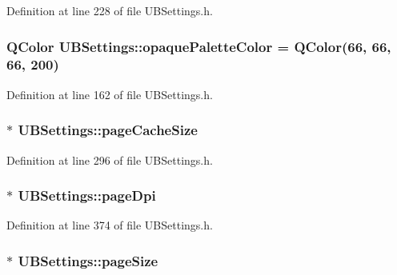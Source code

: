 Definition at line 228 of file U\-B\-Settings.\-h.

\hypertarget{class_u_b_settings_a3b15f9b10941aad5dcc81472fde33ea3}{
\subsubsection[{opaque\-Palette\-Color}]{\setlength{\rightskip}{0pt plus 5cm}Q\-Color U\-B\-Settings\-::opaque\-Palette\-Color = Q\-Color(66, 66, 66, 200)\hspace{0.3cm}{\ttfamily [static]}}}\label{db/d66/class_u_b_settings_a3b15f9b10941aad5dcc81472fde33ea3}


Definition at line 162 of file U\-B\-Settings.\-h.

\hypertarget{class_u_b_settings_aac2ebdada657a3505f3e3b924a02e4f8}{
\subsubsection[{page\-Cache\-Size}]{$\ast$ U\-B\-Settings\-::page\-Cache\-Size}}\label{db/d66/class_u_b_settings_aac2ebdada657a3505f3e3b924a02e4f8}


Definition at line 296 of file U\-B\-Settings.\-h.

\hypertarget{class_u_b_settings_a9da52a4a55207f616c01ec65be66e635}{
\subsubsection[{page\-Dpi}]{$\ast$ U\-B\-Settings\-::page\-Dpi}}\label{db/d66/class_u_b_settings_a9da52a4a55207f616c01ec65be66e635}


Definition at line 374 of file U\-B\-Settings.\-h.

\hypertarget{class_u_b_settings_a0bb5fa51820495ec8eae651b5a4e1b7c}{
\subsubsection[{page\-Size}]{$\ast$ U\-B\-Settings\-::page\-Size}}\label{db/d66/class_u_b_settings_a0bb5fa51820495ec8eae651b5a4e1b7c}



